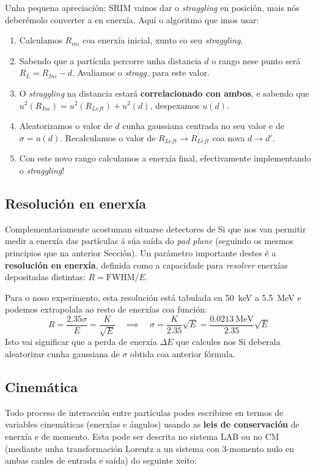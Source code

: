 \documentclass[11pt, a4paper]{article}
\begin{document}
Unha pequena apreciación: SRIM vainos dar o \textit{straggling} en posición, mais nós deberémolo converter a en enerxía. Aquí o algoritmo que imos usar:
\begin{enumerate}
    \item Calculamos $R_{ini}$ coa enerxía inicial, xunto co seu \textit{straggling}.
    \item Sabendo que a partícula percorre unha distancia $d$ o rango nese punto será $R_{L} = R_{Ini} - d$. Avaliamos o \textit{stragg.} para este valor.
    \item O \textit{straggling} na distancia estará \textbf{correlacionado con ambos}, e sabendo que $u^2(R_{Ini}) = u^2(R_{Left}) + u^2(d)$, despexamos $u(d)$.
    \item Aleatorizamos o valor de $d$ cunha gaussiana centrada no seu valor e de $\sigma = u(d)$. Recalculamos o valor de $R_{Left} \longrightarrow R_{Left}^{\prime}$ coa nova $d \longrightarrow d\prime$.
    \item Con este novo rango calculamos a enerxía final, efectivamente implementando o \textit{straggling}!
\end{enumerate}

\subsection{Resolución en enerxía}\label{sec:res}
Complementariamente acostuman situarse detectores de Si que nos van permitir medir a enerxía das partículas á súa saída do \textit{pad plane} (seguindo os mesmos principios que na anterior Sección). Un parámetro importante destes é a \textbf{resolución en enerxía}, definida como a capacidade para \textit{resolver} enerxías depositadas distintas: $R = \textrm{FWHM} / E$.

Para o noso experimento, esta resolución está tabulada en \qty{50}{\keV} a \qty{5.5}{\MeV} e podemos extrapolala ao resto de enerxías coa función:
\begin{equation*}
    R = \frac{2.35 \sigma}{E} = \frac{K}{\sqrt{E}} \quad \implies \quad \sigma = \frac{K}{2.35}\sqrt{E} = \frac{\qty{0.0213}{\MeV}}{2.35} \sqrt{E}
\end{equation*}
Isto vai significar que a perda de enerxía $\Delta E$ que calcules nos Si deberala aleatorizar cunha gaussiana de $\sigma$ obtida coa anterior fórmula.

\subsection{Cinemática}
Todo proceso de interacción entre partículas podes escribirse en termos de variables cinemáticas (enerxías e ángulos) usando as \textbf{leis de conservación} de enerxía e de momento. Esta pode ser descrita no sistema LAB ou no CM (mediante unha transformación Lorentz a un sistema con 3-momento nulo en ambas canles de entrada e saída) do seguinte xeito:
\end{document}
